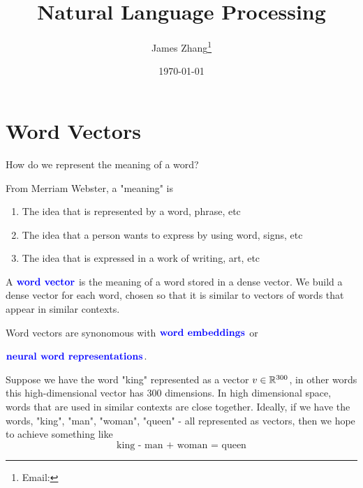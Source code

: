 \documentclass[12pt]{scrartcl}
\begin{document}
\title{Natural Language Processing}
\author{James Zhang\thanks{Email: }}
\date{\today}



\maketitle
\newpage
\tableofcontents
\newpage

\section{Word Vectors}

How do we represent the meaning of a word?

From Merriam Webster, a "meaning" is 
\begin{enumerate}
    \item The idea that is represented by a word, phrase, etc
    \item The idea that a person wants to express by using word, signs, etc
    \item The idea that is expressed in a work of writing, art, etc
\end{enumerate}

\begin{definition}
    A $\textbf{\color{blue} word vector}$ is the meaning of a word stored in a dense vector. We build a dense vector for each word, chosen so that it is similar to vectors of words that appear in similar contexts.
\end{definition}

\begin{note}
    Word vectors are synonomous with $\textbf{\color{blue} word embeddings}$ or 
    
    $\textbf{\color{blue} neural word representations}$.
\end{note}

\begin{example}
    Suppose we have the word "king" represented as a vector $v \in \mathbb R^{300}$, in other words this high-dimensional vector has 300 dimensions. In high dimensional space, words that are used in similar contexts are close together. Ideally, if we have the words, "king", "man", "woman", "queen" - all represented as vectors, then we hope to achieve something like 
    \[\text{king - man + woman = queen}\]
\end{example}
\end{document}
